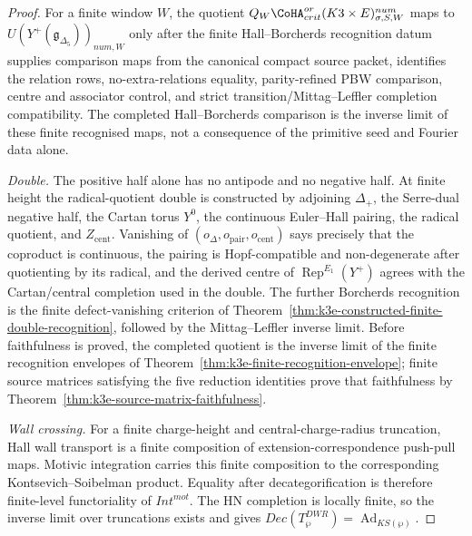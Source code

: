 \begin{proof}
For a finite window \(W\), the quotient
\(Q_W\CoHA^{or}_{crit}(K3\times E)_{\sigma,S,W}^{num}\) maps to
\(U(Y^+(\mathfrak g_{\Delta_5}))_{num,W}\) only after the finite
Hall--Borcherds recognition datum supplies comparison maps from the
canonical compact source packet, identifies the relation rows,
no-extra-relations equality, parity-refined PBW comparison, centre and
associator control, and strict transition/Mittag--Leffler completion
compatibility. The
completed Hall--Borcherds comparison is the inverse limit of these
finite recognised maps, not a consequence of the primitive seed and
Fourier data alone.

\emph{Double.} The positive half alone has no antipode and no negative
half. At finite height the radical-quotient double is constructed by
adjoining \(\Delta_+\), the Serre-dual negative half, the Cartan torus
\(Y^0\), the continuous Euler--Hall pairing, the radical quotient, and
\(Z_{\mathrm{cent}}\). Vanishing of
\((o_{\Delta},o_{\mathrm{pair}},o_{\mathrm{cent}})\) says precisely that
the coproduct is continuous, the pairing is Hopf-compatible and
non-degenerate after quotienting by its radical, and the derived centre
of \(\operatorname{Rep}^{E_1}(Y^+)\) agrees with the Cartan/central
completion used in the double. The further Borcherds recognition is
the finite defect-vanishing criterion of
Theorem~\ref{thm:k3e-constructed-finite-double-recognition}, followed
by the Mittag--Leffler inverse limit. Before faithfulness is proved,
the completed quotient is the inverse limit of the finite recognition
envelopes of Theorem~\ref{thm:k3e-finite-recognition-envelope}; finite
source matrices satisfying the five reduction identities prove that
faithfulness by Theorem~\ref{thm:k3e-source-matrix-faithfulness}.

\emph{Wall crossing.} For a finite charge-height and
central-charge-radius truncation, Hall wall transport is a finite
composition of extension-correspondence push-pull maps. Motivic
integration carries this finite composition to the corresponding
Kontsevich--Soibelman product. Equality after decategorification is
therefore finite-level functoriality of \(Int^{mot}\). The HN
completion is locally finite, so the inverse limit over truncations
exists and gives \(Dec(T^{DWR}_{\wp})=\operatorname{Ad}_{KS(\wp)}\).
\end{proof}

